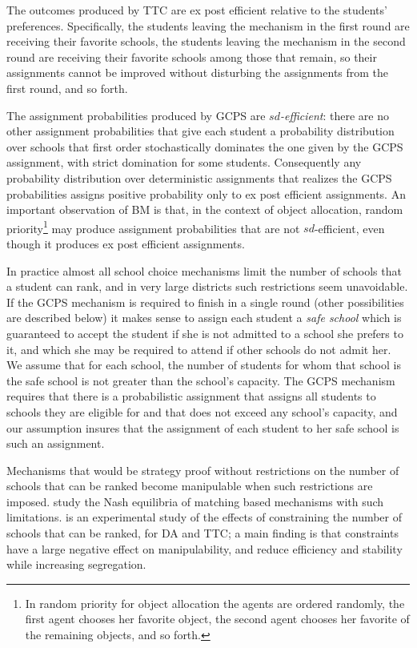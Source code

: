 \documentclass[12pt, A4paper]{article}
\theoremstyle{definition}
\begin{document}
The outcomes produced by TTC are ex post efficient relative to the students' preferences.  Specifically, the students leaving the mechanism in the first round are receiving their favorite schools, the students leaving the mechanism in the second round are receiving their favorite schools among those that remain, so their assignments cannot be improved without disturbing the assignments from the first round, and so forth. 

The assignment probabilities produced by GCPS are \emph{$sd$-efficient}: there are no other assignment probabilities that give each student a probability distribution over schools that first order stochastically dominates the one given by the GCPS assignment, with strict domination for some students.  Consequently any probability distribution over deterministic assignments that realizes the GCPS probabilities assigns positive probability only to ex post efficient assignments.    An important observation of BM is that, in the context of object allocation, random priority\footnote{In random priority for object allocation the agents are ordered randomly, the first agent chooses her favorite object, the second agent chooses her favorite of the remaining objects, and so forth.} may produce assignment probabilities that are not $sd$-efficient, even though it produces ex post efficient assignments.

In practice almost all school choice mechanisms limit the number of schools that a student can rank, and in very large districts 
such restrictions seem unavoidable.  If the GCPS mechanism is required to finish in a single round (other possibilities are described below) it makes sense to assign each student a \emph{safe school} which is guaranteed to accept the student if she is not admitted to a school she prefers to it, and which she may be required to attend if other schools do not admit her.  
We assume that for each school, the number of students for whom that school is the safe school is not greater than the school's capacity.  The GCPS mechanism requires that there is a probabilistic assignment that assigns all students to schools they are eligible for and that does not exceed any school's capacity, and our assumption insures that the assignment of each student to her safe school is such an assignment.

Mechanisms that would be strategy proof without restrictions on the number of schools that can be ranked become manipulable when such restrictions are imposed.  \cite{hk09jet} study the Nash equilibria of matching based mechanisms with such limitations.  \cite{chk10aer} is an experimental study of the effects of constraining the number of schools that can be ranked, for DA and TTC; a main finding is that constraints have a large negative effect on manipulability, and reduce efficiency and stability while increasing segregation.
\end{document}

